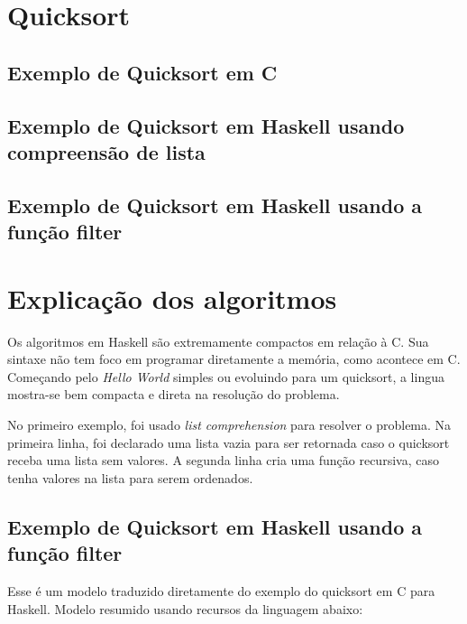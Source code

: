 \documentclass[
  12pt,				         %
  oneside,			       %
  a4paper,			       %
  english,		       	 %
  brazil,			      	 %
]{abntex2}
\begin{document}
      \section{Quicksort}
      \subsection{Exemplo de Quicksort em C}

      
      \subsection{Exemplo de Quicksort em Haskell usando compreensão de lista} 

            

      \newpage

      \subsection{Exemplo de Quicksort em Haskell usando a função filter}

      

      \section{Explicação dos algoritmos}
      Os algoritmos em Haskell são extremamente compactos em relação à C. Sua sintaxe não tem foco
      em programar diretamente a memória, como acontece em C. Começando pelo \emph{Hello World} simples ou evoluindo
      para um quicksort, a lingua mostra-se bem compacta e direta na resolução do problema.

      No primeiro exemplo, foi usado \emph{list comprehension} para resolver o problema. Na primeira linha,
      foi declarado uma lista vazia para ser retornada caso o quicksort receba uma lista sem valores. A segunda linha
      cria uma função recursiva, caso tenha valores na lista para serem ordenados.

      \subsection{Exemplo de Quicksort em Haskell usando a função filter}

      

      Esse é um modelo traduzido diretamente do exemplo do quicksort em C para Haskell. Modelo resumido usando recursos da linguagem
      abaixo:
\end{document}
